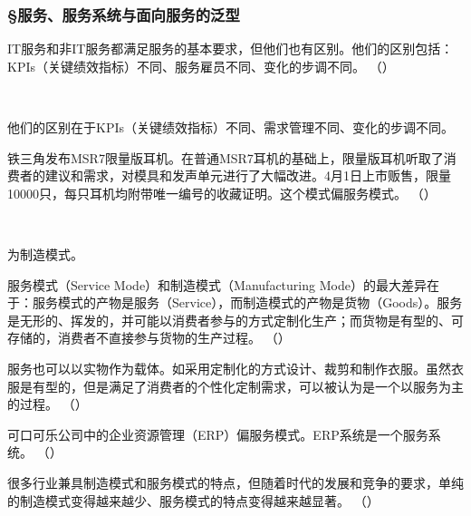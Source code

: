 \subsubsection*{\S 服务、服务系统与面向服务的泛型}
\setcounter{problemname}{0}


\begin{problem}
	IT服务和非IT服务都满足服务的基本要求，但他们也有区别。他们的区别包括：KPIs（关键绩效指标）不同、服务雇员不同、变化的步调不同。
	\hfill （）
\end{problem}
\\ \begin{solution}
	他们的区别在于KPIs（关键绩效指标）不同、需求管理不同、变化的步调不同。
\end{solution}


\begin{problem}
	铁三角发布MSR7限量版耳机。在普通MSR7耳机的基础上，限量版耳机听取了消费者的建议和需求，对模具和发声单元进行了大幅改进。4月1日上市贩售，限量10000只，每只耳机均附带唯一编号的收藏证明。这个模式偏服务模式。
	\hfill （）
\end{problem}
\\ \begin{solution}
	为制造模式。
\end{solution}


\begin{problem}
	服务模式（Service Mode）和制造模式（Manufacturing Mode）的最大差异在于：服务模式的产物是服务（Service），而制造模式的产物是货物（Goods）。服务是无形的、挥发的，并可能以消费者参与的方式定制化生产；而货物是有型的、可存储的，消费者不直接参与货物的生产过程。
	\hfill （）
\end{problem}


\begin{problem}
	服务也可以以实物作为载体。如采用定制化的方式设计、裁剪和制作衣服。虽然衣服是有型的，但是满足了消费者的个性化定制需求，可以被认为是一个以服务为主的过程。
	\hfill （）
\end{problem}


\begin{problem}
	可口可乐公司中的企业资源管理（ERP）偏服务模式。ERP系统是一个服务系统。
	\hfill （）
\end{problem}


\begin{problem}
	很多行业兼具制造模式和服务模式的特点，但随着时代的发展和竞争的要求，单纯的制造模式变得越来越少、服务模式的特点变得越来越显著。
	\hfill （）
\end{problem}



